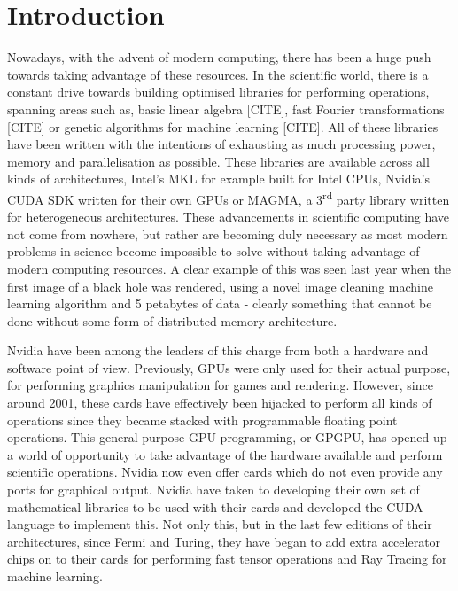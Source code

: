 \clearpage
\chapter{Introduction}

Nowadays, with the advent of modern computing, there has been a huge push towards taking advantage of these resources. In the scientific world, there is a constant drive towards building optimised libraries for performing operations, spanning areas such as, basic linear algebra [CITE], fast Fourier transformations [CITE] or genetic algorithms for machine learning [CITE]. All of these libraries have been written with the intentions of exhausting as much processing power, memory and parallelisation as possible. These libraries are available across all kinds of architectures, Intel's MKL for example built for Intel CPUs, Nvidia's CUDA SDK written for their own GPUs or MAGMA, a 3\textsuperscript{rd} party library written for heterogeneous architectures. These advancements in scientific computing have not come from nowhere, but rather are becoming duly necessary as most modern problems in science become impossible to solve without taking advantage of modern computing resources. A clear example of this was seen last year when the first image of a black hole was rendered, using a novel image cleaning machine learning algorithm and 5 petabytes of data - clearly something that cannot be done without some form of distributed memory architecture.

Nvidia have been among the leaders of this charge from both a hardware and software point of view. Previously, GPUs were only used for their actual purpose, for performing graphics manipulation for games and rendering. However, since around 2001, these cards have effectively been hijacked to perform all kinds of operations since they became stacked with programmable floating point operations. This general-purpose GPU programming, or GPGPU, has opened up a world of opportunity to take advantage of the hardware available and perform scientific operations. Nvidia now even offer cards which do not even provide any ports for graphical output. Nvidia have taken to developing their own set of mathematical libraries to be used with their cards and developed the CUDA language to implement this. Not only this, but in the last few editions of their architectures, since Fermi and Turing, they have began to add extra accelerator chips on to their cards for performing fast tensor  operations and Ray Tracing for machine learning.

